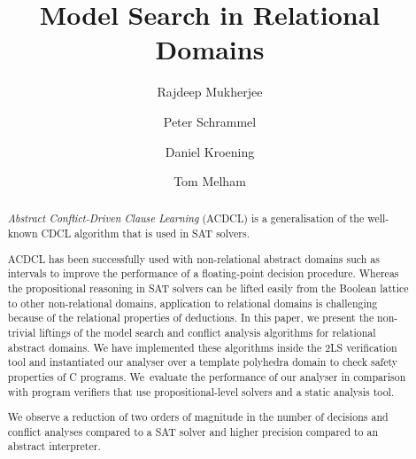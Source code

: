 \documentclass[a4paper]{llncs}
\newcommand{\Omit}[1]{}
\begin{document}
\title{Model Search in Relational Domains}

\author{Rajdeep Mukherjee \and Peter Schrammel \and
Daniel Kroening \and Tom Melham}


\maketitle

\begin{abstract}
%
\emph{Abstract Conflict-Driven Clause Learning} (ACDCL) is a generalisation
of the well-known CDCL algorithm that is used in SAT solvers.
%
\Omit {  ACDCL alternates between a model search, which
performs over-approximate deduction with constraint propagation, and a
conflict analysis, which performs under-approximate abduction with heuristic
choice.
}
%
ACDCL has been successfully used with non-relational abstract domains such
as intervals to improve the performance of a floating-point decision
procedure.  Whereas the propositional reasoning in SAT 
solvers can be lifted easily from the Boolean lattice to other 
non-relational domains, application to relational domains is 
challenging because of the relational properties of deductions.
%
In this paper, we present the non-trivial liftings of the model search and
conflict analysis algorithms for relational abstract domains.  We have
implemented these algorithms inside the 2LS verification tool and
instantiated our analyser over a template polyhedra domain to check safety
properties of C programs.  We~evaluate the performance of our analyser in
comparison with program verifiers that use propositional-level solvers and
a static analysis tool.
%
\Omit {
on a set of benchmarks drawn from bit-vector regression 
in SV-COMP'16, bit-precise software models of hardware 
circuits auto-generated from v2c tool, and several 
bounds checking benchmarks 
}
We observe a reduction of two orders of magnitude in the number of 
decisions and conflict analyses compared to a SAT 
solver and higher precision compared to an abstract interpreter. 
\Omit{
along with stronger deductions and learnt clauses aided by the richer
abstract domains.
}
%
\end{abstract}
\end{document}
